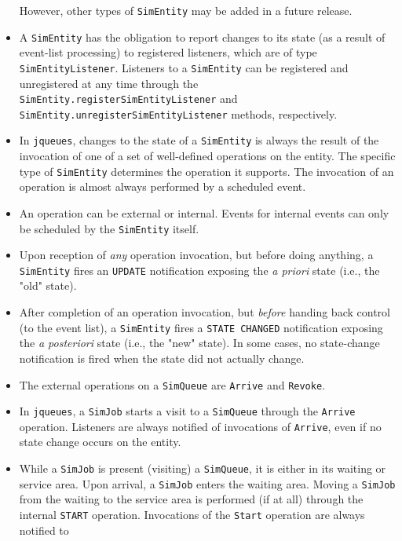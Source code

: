 \begin{itemize}
	However, other types of \lstinline|SimEntity| may be added in a future release.
	\item A \lstinline|SimEntity| has the obligation to report
	changes to its state (as a result of event-list processing)
	to registered listeners,
	which are of type \lstinline|SimEntityListener|.
	Listeners to a \lstinline|SimEntity| can be registered and
	unregistered at any time through the
	\lstinline|SimEntity.registerSimEntityListener|
	and \lstinline|SimEntity.unregisterSimEntityListener|
	methods, respectively.
	\item In \lstinline|jqueues|, changes to the state
	of a \lstinline|SimEntity| is always the result
	of the invocation of one of a set of well-defined
	operations on the entity.
	The specific type of \lstinline|SimEntity|
	determines the operation it supports.
	The invocation of an operation is
	almost always performed by a scheduled event.
	\item An operation can be external or internal.
	Events for internal events can only be scheduled
	by the \lstinline|SimEntity| itself.
	\item Upon reception of {\em any\/} operation invocation,
	but before doing anything,
	a \lstinline|SimEntity| fires an \lstinline|UPDATE|
	notification exposing the {\em a priori\/} state
	(i.e., the "old" state).
	\item After completion of an operation invocation,
	but {\em before\/} handing back control (to the event list),
	a \lstinline|SimEntity| fires a \lstinline|STATE CHANGED|
	notification exposing the {\em a posteriori\/} state
	(i.e., the "new" state).
	In some cases, no state-change notification is fired when
	the state did not actually change.
	\item The external operations on a \lstinline|SimQueue| are
	\lstinline|Arrive| and \lstinline|Revoke|.
	\item In \lstinline|jqueues|,
	a \lstinline|SimJob| starts a visit to a \lstinline|SimQueue|
	through the \lstinline|Arrive| operation.
	Listeners are always notified of invocations of \lstinline|Arrive|,
	even if no state change occurs on the entity.
	\item While a \lstinline|SimJob| is present (visiting) a \lstinline|SimQueue|,
	it is either in its waiting or service area.
	Upon arrival, a \lstinline|SimJob| enters the waiting area.
	Moving a \lstinline|SimJob| from the waiting to the service area
	is performed (if at all) through the internal \lstinline|START|
	operation.
	Invocations of the \lstinline|Start| operation are always notified to

\end{itemize}
